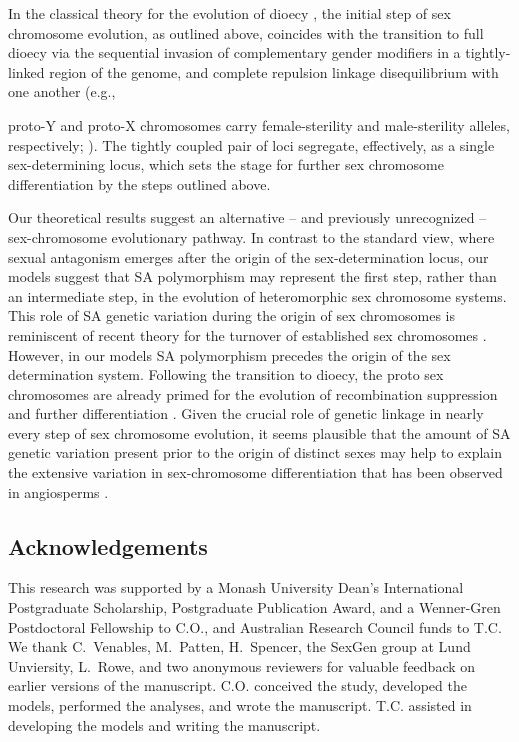\documentclass{article}
\begin{document}
In the classical theory for the evolution of dioecy \citep{Charlesworth1978a}, the initial step of sex chromosome evolution, as outlined above, coincides with the transition to full dioecy via the sequential invasion of complementary gender modifiers in a tightly-linked region of the genome, and complete repulsion linkage disequilibrium with one another (e.g., {proto-Y and proto-X chromosomes carry female-sterility and male-sterility alleles, respectively; \citealt{Charlesworth1978a}). The tightly coupled pair of loci segregate, effectively, as a single sex-determining locus, which sets the stage for further sex chromosome differentiation by the steps outlined above.

Our theoretical results suggest an alternative -- and previously unrecognized -- sex-chromosome evolutionary pathway. In contrast to the standard view, where sexual antagonism emerges after the origin of the sex-determination locus, our models suggest that SA polymorphism may represent the first step, rather than an intermediate step, in the evolution of heteromorphic sex chromosome systems. This role of SA genetic variation during the origin of sex chromosomes is reminiscent of recent theory for the turnover of established sex chromosomes \citep{vanDoornKirkpatrick2007,vanDoornKirkpatrick2010}. However, in our models SA polymorphism precedes the origin of the sex determination system. Following the transition to dioecy, the proto sex chromosomes are already primed for the evolution of recombination suppression and further differentiation \citep{Charlesworth1978a,Rice1987,Bachtrog2006,Qiuetal2013}. Given the crucial role of genetic linkage in nearly every step of sex chromosome evolution, it seems plausible that the amount of SA genetic variation present prior to the origin of distinct sexes may help to explain the extensive variation in sex-chromosome differentiation that has been observed in angiosperms \citep{Charlesworth2002,Renner2014,Bachtrog2014}.


\subsection*{Acknowledgements}
This research was supported by a Monash University Dean's International Postgraduate Scholarship, Postgraduate Publication Award, and a Wenner-Gren Postdoctoral Fellowship to C.O., and Australian Research Council funds to T.C. We thank C.~Venables, M.~Patten, H.~Spencer, the SexGen group at Lund Unviersity, L.~Rowe, and two anonymous reviewers for valuable feedback on earlier versions of the manuscript. C.O. conceived the study, developed the models, performed the analyses, and wrote the manuscript. T.C. assisted in developing the models and writing the manuscript.


}
\end{document}
